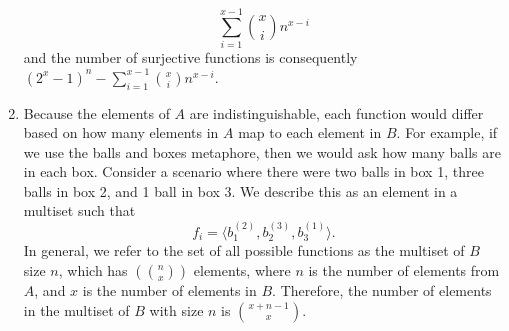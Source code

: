 \documentclass{article}
\begin{document}
\begin{enumerate}
\begin{equation*}
	\sum_{i=1}^{x-1}{x\choose i}n^{x - i}
\end{equation*}
and the number of surjective functions is consequently $(2^x - 1)^n - \sum_{i=1}^{x-1}{x\choose i}n^{x - i}$.
\item Because the elements of $A$ are indistinguishable, each function would differ based on how many elements in $A$ map to each element in $B$. For example, if we use the balls and boxes metaphore, then we would ask how many balls are in each box. Consider a scenario where there were two balls in box 1, three balls in box 2, and 1 ball in box 3. We describe this as an element in a multiset such that 
\begin{equation*}
	f_i = \langle b_1^{(2)}, b_2^{(3)}, b_3^{(1)}\rangle.
\end{equation*}
In general, we refer to the set of all possible functions as the multiset of $B$ size $n$, which has  $\left ( {n \choose x} \right )$ elements, where $n$ is the number of elements from $A$, and $x$ is the number of elements in $B$. Therefore, the number of elements in the multiset of $B$ with size $n$ is ${x + n - 1 \choose x}$. 


\end{enumerate}
\end{document}
